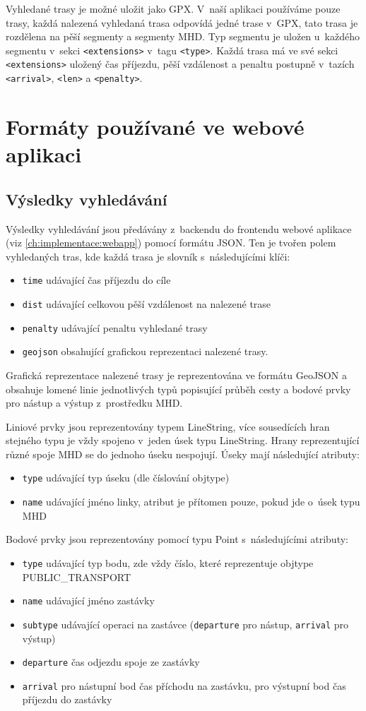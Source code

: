 Vyhledané trasy je možné uložit jako GPX\cite{GPX}. V~naší aplikaci používáme pouze trasy, každá
nalezená vyhledaná trasa odpovídá jedné trase v~GPX, tato trasa je rozdělena na
pěší segmenty a segmenty MHD. Typ segmentu je uložen u~každého segmentu v~sekci
{\tt <extensions>} v~tagu {\tt <type>}. Každá trasa má ve své sekci {\tt
<extensions>} uložený čas příjezdu, pěší vzdálenost a penaltu postupně v~tazích
{\tt <arrival>}, {\tt <len>} a {\tt <penalty>}.

\section{Formáty používané ve webové aplikaci}
\subsection{Výsledky vyhledávání}
Výsledky vyhledávání jsou předávány z~backendu do frontendu webové aplikace
(viz \ref{ch:implementace:webapp}) pomocí formátu JSON\cite{JSON}. Ten je tvořen polem vyhledaných
tras, kde každá trasa je slovník s~následujícími klíči:
\begin{itemize}
	\item {\tt time} udávající čas příjezdu do cíle
	\item {\tt dist} udávající celkovou pěší vzdálenost na nalezené trase
	\item {\tt penalty} udávající penaltu vyhledané trasy
	\item {\tt geojson} obsahující grafickou reprezentaci nalezené trasy. 
\end{itemize}
Grafická reprezentace nalezené trasy je reprezentována ve formátu
GeoJSON\cite{GeoJSON} a
obsahuje lomené linie jednotlivých typů popisující průběh cesty a bodové prvky
pro nástup a výstup z~prostředku MHD.

Liniové prvky jsou reprezentovány typem LineString, více sousedících hran
stejného typu je vždy spojeno v~jeden úsek typu LineString. Hrany reprezentující různé
spoje MHD se do jednoho úseku nespojují. Úseky mají následující atributy: 
\begin{itemize}
	\item {\tt type} udávající typ úseku (dle číslování objtype)
	\item {\tt name} udávající jméno linky, atribut je přítomen pouze, pokud
	jde o~úsek typu MHD
\end{itemize}
Bodové prvky jsou reprezentovány pomocí typu Point s~následujícími atributy: 
\begin{itemize}
	\item {\tt type} udávající typ bodu, zde vždy číslo, které reprezentuje objtype PUBLIC\_TRANSPORT  	
	\item {\tt name} udávající jméno zastávky
	\item {\tt subtype} udávající operaci na zastávce ({\tt departure} pro
	nástup, {\tt arrival} pro výstup)
	\item {\tt departure} čas odjezdu spoje ze zastávky
	\item {\tt arrival} pro nástupní bod čas příchodu na zastávku, pro
	výstupní bod čas příjezdu do zastávky
\end{itemize}
